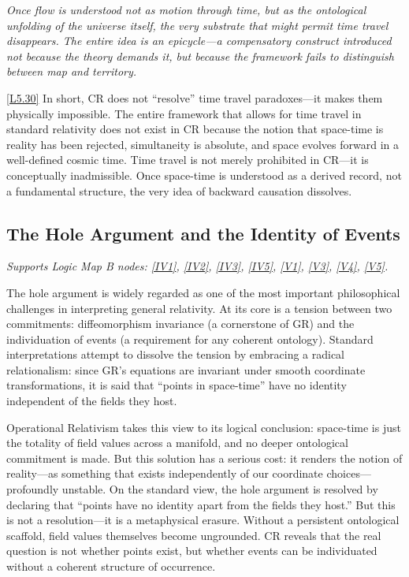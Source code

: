 \documentclass[12pt]{book}
\newcounter{logicanchor}
\newenvironment{logicanchorenv}[1]{\refstepcounter{logicanchor}\label{#1}}{}
\newcommand{\logiclink}[2]{\begin{logicanchorenv}{logic:#1}\end{logicanchorenv}\hyperref[appendix:#1]{[#1]}\xspace}
\begin{document}
\textit{Once flow is understood not as motion through time, but as the ontological unfolding of the universe itself, the very substrate that might permit time travel disappears. The entire idea is an epicycle---a compensatory construct introduced not because the theory demands it, but because the framework fails to distinguish between map and territory.}

\logiclink{L5.30}{} In short, CR does not ``resolve'' time travel paradoxes---it makes them physically impossible. The entire framework that allows for time travel in standard relativity does not exist in CR because the notion that space-time is reality has been rejected, simultaneity is absolute, and space evolves forward in a well-defined cosmic time. Time travel is not merely prohibited in CR---it is conceptually inadmissible. Once space-time is understood as a derived record, not a fundamental structure, the very idea of backward causation dissolves.

\subsection{The Hole Argument and the Identity of Events}\label{sec:5.4.3}
\noindent\textit{Supports Logic Map B nodes: \hyperref[appendix:IV1]{[IV1]}, \hyperref[appendix:IV2]{[IV2]}, \hyperref[appendix:IV3]{[IV3]}, \hyperref[appendix:IV5]{[IV5]}, \hyperref[appendix:V1]{[V1]}, \hyperref[appendix:V3]{[V3]}, \hyperref[appendix:V4]{[V4]}, \hyperref[appendix:V5]{[V5]}.}

\vspace{4pt}

The hole argument is widely regarded as one of the most important philosophical challenges in interpreting general relativity. At its core is a tension between two commitments: diffeomorphism invariance (a cornerstone of GR) and the individuation of events (a requirement for any coherent ontology). Standard interpretations attempt to dissolve the tension by embracing a radical relationalism: since GR's equations are invariant under smooth coordinate transformations, it is said that ``points in space-time'' have no identity independent of the fields they host.

Operational Relativism takes this view to its logical conclusion: space-time is just the totality of field values across a manifold, and no deeper ontological commitment is made. But this solution has a serious cost: it renders the notion of reality---as something that exists independently of our coordinate choices---profoundly unstable. On the standard view, the hole argument is resolved by declaring that ``points have no identity apart from the fields they host.'' But this is not a resolution---it is a metaphysical erasure. Without a persistent ontological scaffold, field values themselves become ungrounded. CR reveals that the real question is not whether points exist, but whether events can be individuated without a coherent structure of occurrence.
\end{document}
